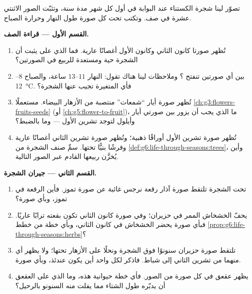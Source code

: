 \begin{problem}\label{pb:g6:life-through-seasons:1}
تصوّر لينا شجرة الكستناء عند البوابة في أول كل شهر مدة سنة، وتثبّت
الصور الاثنتي عشرة في صف. وتكتب تحت كل صورة طول النهار وحرارة
الصباح.

\medskip\noindent\textbf{القسم الأول --- قراءة الصف.}
\begin{enumerate}
  \item تُظهر صورتا كانون الثاني وكانون الأول أغصانًا عارية. فما
        الذي على  يثبت أن الشجرة حية ومستعدة للربيع في
        الصورتين؟
  \item بين أي صورتين تنفتح ؟ وملاحظات لينا هناك تقول:
        النهار $11$--$13$ ساعة، والصباح
        $8$--\qty{12}{\degreeCelsius}. فأي  المتغيرة
        تجيب عنها الشجرة؟
  \item تُظهر صورة أيار ``شمعات'' منتصبة من الأزهار البيضاء.
        مستعملًا \cref{ch:g3:flowers-fruits-seeds} (أو
        \cref{ch:g5:flower-to-fruit})، ما الذي يجب أن يزور بين
        صورتي أيار وأيلول لتوجد  تشرين الأول --- وما 
        بالضبط؟
  \item تُظهر صورة تشرين الأول أوراقًا ذهبية؛ وتُظهر صورة تشرين
        الثاني أغصانًا عارية وفرشًا بنيًّا تحتها. سمِّ صنف الشجرة
        من \cref{def:g6:life-through-seasons:trees}، وأين
        يُخزَّن ربيعها القادم عبر الصور التالية.
\end{enumerate}

\medskip\noindent\textbf{القسم الثاني --- جيران الشجرة.}
\begin{enumerate}[resume]
  \item تحت الشجرة تلتقط صورة آذار رقعة نرجس غائبة عن صورة تموز.
        فأين الرقعة في تموز، وبأي صورة؟
  \item يحفّ الخشخاش الممر في حزيران؛ وفي صورة كانون الثاني تكون
        بقعته ترابًا عاريًا. فبأي صورة يحضر الخشخاش في كانون
        الثاني، وبأي خطة من خطط
        \cref{prop:g6:life-through-seasons:herbs}؟
  \item تلتقط صورة حزيران سنونوًا فوق الشجرة ونحلًا على الأزهار
        تحتها؛ ولا يظهر أي منهما من تشرين الثاني إلى شباط. فاذكر
        لكل واحد أين يكون عندئذ، وبأي صورة.
  \item يظهر عقعق في كل صورة من الصور. فأي خطة حيوانية هذه، وما
        الذي على العقعق أن يدبّره طول الشتاء مما يفلت منه
        السنونو بالرحيل؟
\end{enumerate}


\end{problem}
